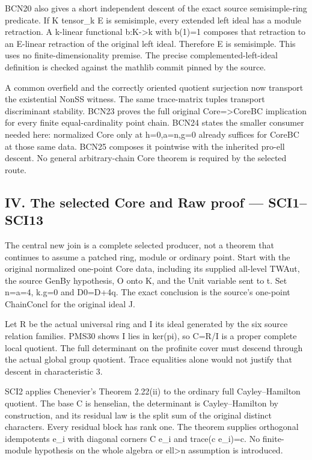 BCN20 also gives a short independent descent of the exact source semisimple-ring predicate. If K tensor\_\allowbreak{}k E is semisimple, every extended left ideal has a module retraction. A k-linear functional b:K->k with b(1)=1 composes that retraction to an E-linear retraction of the original left ideal. Therefore E is semisimple. This uses no finite-dimensionality premise. The precise complemented-left-ideal definition is checked against the mathlib commit pinned by the source.

A common overfield and the correctly oriented quotient surjection now transport the existential NonSS witness. The same trace-matrix tuples transport discriminant stability. BCN23 proves the full original Core=>CoreBC implication for every finite equal-cardinality point chain. BCN24 states the smaller consumer needed here: normalized Core only at h=0,a=n,g=0 already suffices for CoreBC at those same data. BCN25 composes it pointwise with the inherited pro-ell descent. No general arbitrary-chain Core theorem is required by the selected route.

\subsection{IV. The selected Core and Raw proof — SCI1–SCI13}

The central new join is a complete selected producer, not a theorem that continues to assume a patched ring, module or ordinary point. Start with the original normalized one-point Core data, including its supplied all-level TWAut, the source GenBy hypothesis, O onto K, and the Unit variable sent to t. Set n=a=4, k.g=0 and D0=D+4q. The exact conclusion is the source's one-point ChainConcl for the original ideal J.

Let R be the actual universal ring and I its ideal generated by the six source relation families. PMS30 shows I lies in ker(pi), so C=R/\allowbreak{}I is a proper complete local quotient. The full determinant on the profinite cover must descend through the actual global group quotient. Trace equalities alone would not justify that descent in characteristic 3.

SCI2 applies Chenevier's Theorem 2.22(ii) to the ordinary full Cayley–Hamilton quotient. The base C is henselian, the determinant is Cayley–Hamilton by construction, and its residual law is the split sum of the original distinct characters. Every residual block has rank one. The theorem supplies orthogonal idempotents e\_\allowbreak{}i with diagonal corners C e\_\allowbreak{}i and trace(c e\_\allowbreak{}i)=c. No finite-module hypothesis on the whole algebra or ell>n assumption is introduced.

